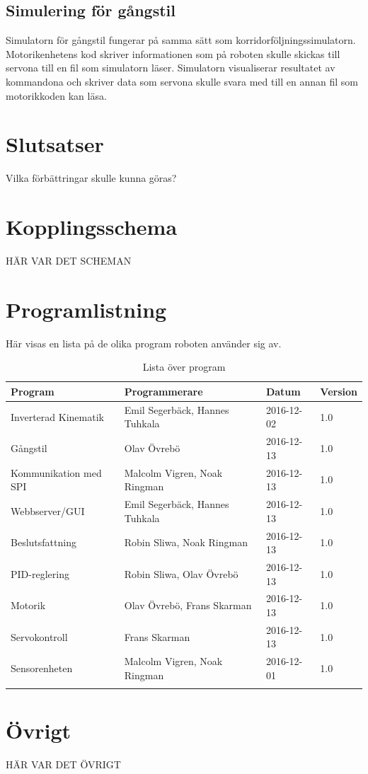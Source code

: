 \documentclass[a4paper,titlepage,12pt]{article}
\begin{document}
	\subsection{Simulering för gångstil}
	Simulatorn för gångstil fungerar på samma sätt som
    korridorföljningssimulatorn. Motorikenhetens kod skriver informationen som
    på roboten skulle skickas till servona till en fil som simulatorn läser.
    Simulatorn visualiserar resultatet av kommandona och skriver data som
    servona skulle svara med till en annan fil som motorikkoden kan läsa.

	\section{Slutsatser}
	Vilka förbättringar skulle kunna göras?

	\appendix
	\section{Kopplingsschema}
	HÄR VAR DET SCHEMAN
	
	\section{Programlistning}
	Här visas en lista på de olika program roboten
	använder sig av.
	
	\begin{longtable}[c]{l l l l}
		\textbf{Program} & \textbf{Programmerare} & \textbf{Datum}& \textbf{Version} \\ \midrule
		Inverterad Kinematik & Emil Segerbäck, Hannes Tuhkala & 2016-12-02 & 1.0 \\
		Gångstil & Olav Övrebö & 2016-12-13 & 1.0 \\ 
		Kommunikation med SPI & Malcolm Vigren, Noak Ringman & 2016-12-13 & 1.0 \\ 
		Webbserver/GUI & Emil Segerbäck, Hannes Tuhkala & 2016-12-13 & 1.0 \\ 
		Beslutsfattning & Robin Sliwa, Noak Ringman & 2016-12-13 & 1.0 \\ 
		PID-reglering & Robin Sliwa, Olav Övrebö & 2016-12-13 & 1.0 \\ 
		Motorik & Olav Övrebö, Frans Skarman & 2016-12-13 & 1.0 \\ 
		Servokontroll & Frans Skarman & 2016-12-13 & 1.0 \\ 
		Sensorenheten & Malcolm Vigren, Noak Ringman & 2016-12-01 & 1.0 \\
		
		\caption{Lista över program \label{table:programlisting}}
	\end{longtable}
	
	\section{Övrigt}
	HÄR VAR DET ÖVRIGT
	
	
\end{document}
